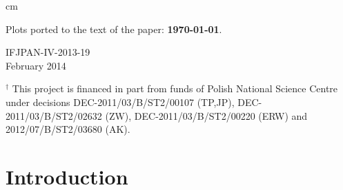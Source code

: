 \documentclass{article}
\begin{document}
\begin{titlepage}
 cm

Plots  ported to the text of the paper: {\bf \today}. 


\vspace{0.2 cm}
 
\vspace{0.1 cm}
\vfill
{\small
\begin{flushleft}
{   IFJPAN-IV-2013-19
\\ February 2014
}
\end{flushleft}
}
 
\vspace*{1mm}
\footnoterule
\noindent
{\footnotesize \noindent  $^{\dag}$
This project is financed in part from funds of Polish National Science
Centre under decisions  DEC-2011/03/B/ST2/00107 (TP,JP), DEC-2011/03/B/ST2/02632 (ZW), DEC-2011/03/B/ST2/00220 (ERW)
and 2012/07/B/ST2/03680 (AK).
}
\end{titlepage}
\newpage
\tableofcontents

\newpage
\section{Introduction}
\end{document}
